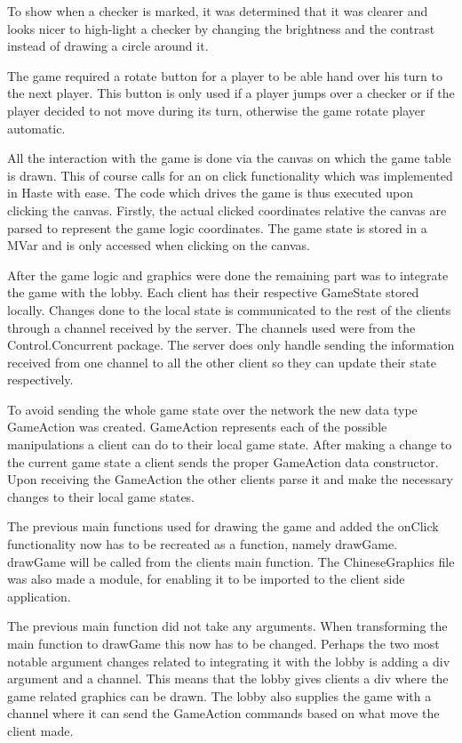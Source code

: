 \documentclass[a4paper]{article}
\begin{document}
To show when a checker is marked, it was determined that it was clearer and looks nicer to high-light a checker by changing the brightness and the contrast instead of drawing a circle around it.

The game required a rotate button for a player to be able hand over his turn to the next player. This button is only used if a player jumps over a checker or if the player decided to not move during its turn, otherwise the game rotate player automatic.

All the interaction with the game is done via the canvas on which the game table is drawn. This of course calls for an on click functionality which was
implemented in Haste with ease. The code which drives the game is thus executed upon clicking the canvas. Firstly, the actual clicked coordinates relative the canvas are parsed to represent the game logic coordinates. The game state is stored in a MVar and is only accessed when clicking on the canvas.

After the game logic and graphics were done the remaining part was to integrate the game with the lobby. Each client has their respective GameState stored locally. Changes done to the local state is communicated to the rest of the clients through a channel received by the server. The channels used were from the Control.Concurrent package. The server does only handle sending the information received from one channel to all the other client so they can update their state respectively.

To avoid sending the whole game state over the network the new data type GameAction was created. GameAction represents each of the possible manipulations a client can do to their local game state. After making a change to the current game state a client sends the proper GameAction data constructor. Upon receiving the GameAction the other clients parse it and make the necessary changes to their local game states.

The previous main functions used for drawing the game and added the onClick functionality now has to be recreated as a function, namely drawGame. drawGame will be called from the clients main function. The ChineseGraphics file was also
made a module, for enabling it to be imported to the client side application.

The previous main function did not take any arguments. When transforming the main function to drawGame this now has to be changed. Perhaps the two most notable argument changes related to integrating it with the lobby is
adding a div argument and a channel. This means that the lobby gives clients a div where the game related graphics can be drawn. The lobby also supplies the game with a channel where it can send the GameAction commands based on what move the client made.
\end{document}
